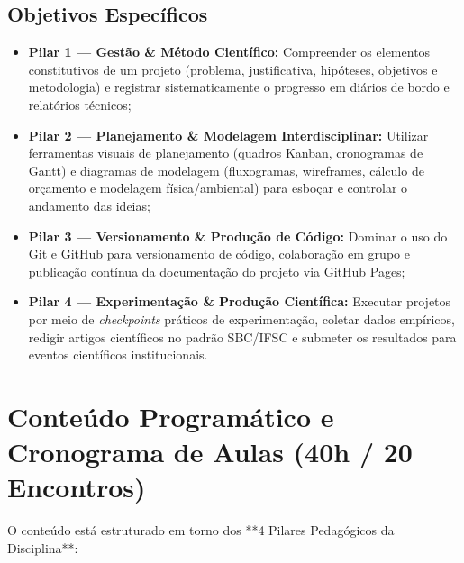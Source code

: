 \documentclass[12pt,a4paper]{article}
\begin{document}
\subsection{Objetivos Específicos}
\begin{itemize}[leftmargin=*]
    \item \textbf{Pilar 1 — Gestão \& Método Científico:} Compreender os elementos constitutivos de um projeto (problema, justificativa, hipóteses, objetivos e metodologia) e registrar sistematicamente o progresso em diários de bordo e relatórios técnicos;
    \item \textbf{Pilar 2 — Planejamento \& Modelagem Interdisciplinar:} Utilizar ferramentas visuais de planejamento (quadros Kanban, cronogramas de Gantt) e diagramas de modelagem (fluxogramas, wireframes, cálculo de orçamento e modelagem física/ambiental) para esboçar e controlar o andamento das ideias;
    \item \textbf{Pilar 3 — Versionamento \& Produção de Código:} Dominar o uso do Git e GitHub para versionamento de código, colaboração em grupo e publicação contínua da documentação do projeto via GitHub Pages;
    \item \textbf{Pilar 4 — Experimentação \& Produção Científica:} Executar projetos por meio de \textit{checkpoints} práticos de experimentação, coletar dados empíricos, redigir artigos científicos no padrão SBC/IFSC e submeter os resultados para eventos científicos institucionais.
\end{itemize}

\section{Conteúdo Programático e Cronograma de Aulas (40h / 20 Encontros)}

O conteúdo está estruturado em torno dos **4 Pilares Pedagógicos da Disciplina**:
\end{document}
